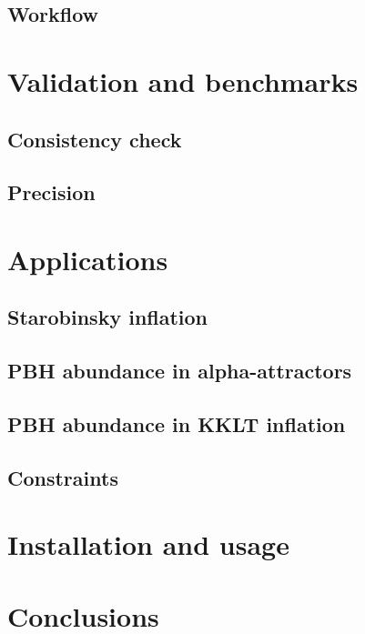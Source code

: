 \documentclass{SciPost}
\begin{document}
    \subsection{Workflow}

\section{Validation and benchmarks}
\label{sec4}

    \subsection{Consistency check}
    \subsection{Precision}

\section{Applications}
\label{sec5}

    \subsection{Starobinsky inflation}
    \subsection{PBH abundance in alpha-attractors}
    \subsection{PBH abundance in KKLT inflation}
    \subsection{Constraints}


\section{Installation and usage}
\label{sec6}


\section{Conclusions}
\label{sec7}




\end{document}
